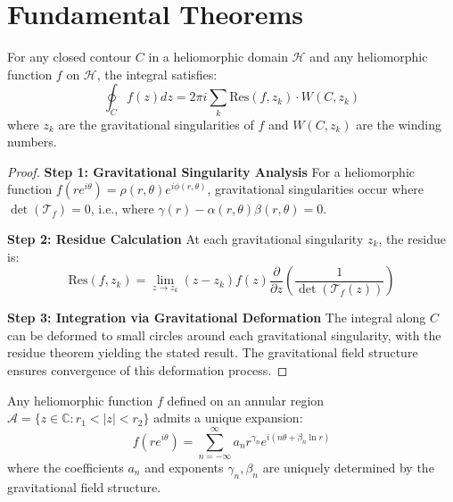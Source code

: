 \section{Fundamental Theorems}

\begin{theorem}
\label{thm:heliomorphic_integration}
For any closed contour $C$ in a heliomorphic domain $\mathcal{H}$ and any heliomorphic function $f$ on $\mathcal{H}$, the integral satisfies:
$$\oint_C f(z) dz = 2\pi i \sum_{k} \text{Res}(f, z_k) \cdot W(C, z_k)$$
where $z_k$ are the gravitational singularities of $f$ and $W(C, z_k)$ are the winding numbers.
\end{theorem}

\begin{proof}
\textbf{Step 1: Gravitational Singularity Analysis}
For a heliomorphic function $f(re^{i\theta}) = \rho(r,\theta) e^{i\phi(r,\theta)}$, gravitational singularities occur where $\det(\mathcal{T}_f) = 0$, i.e., where $\gamma(r) - \alpha(r,\theta)\beta(r,\theta) = 0$.

\textbf{Step 2: Residue Calculation}
At each gravitational singularity $z_k$, the residue is:
$$\text{Res}(f, z_k) = \lim_{z \to z_k} (z - z_k) f(z) \frac{\partial}{\partial z}\left(\frac{1}{\det(\mathcal{T}_f(z))}\right)$$

\textbf{Step 3: Integration via Gravitational Deformation}
The integral along $C$ can be deformed to small circles around each gravitational singularity, with the residue theorem yielding the stated result. The gravitational field structure ensures convergence of this deformation process.
\end{proof}

\begin{theorem}
\label{thm:heliomorphic_laurent}
Any heliomorphic function $f$ defined on an annular region $\mathcal{A} = \{z \in \mathbb{C} : r_1 < |z| < r_2\}$ admits a unique expansion:
$$f(re^{i\theta}) = \sum_{n=-\infty}^{\infty} a_n r^{\gamma_n} e^{i(n\theta + \beta_n \ln r)}$$
where the coefficients $a_n$ and exponents $\gamma_n, \beta_n$ are uniquely determined by the gravitational field structure.
\end{theorem}

